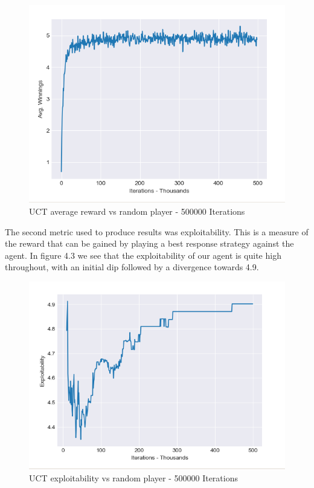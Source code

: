 \begin{figure}[ht]
    \includegraphics[scale=.7]{images/avg_reward_500000__20_random.png}
    \caption{UCT average reward vs random player - 500000 Iterations}
\end{figure}

The second metric used to produce results was exploitability.
This is a measure of the reward that can be gained by playing a best response strategy
against the agent.
In figure 4.3 we see that the exploitability of our agent is quite high throughout, with an
initial dip followed by a divergence towards 4.9.

\begin{figure}[ht]
    \includegraphics[scale=.7]{images/exploitability_500000_20_random.png}
    \caption{UCT exploitability vs random player - 500000 Iterations}
\end{figure}

